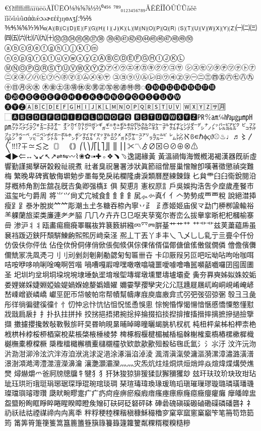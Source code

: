 €ΩﬀﬃﬄāīūēōĀĪŪĒŌ⅛⅜⅝⅞⅓⅔⁰⁴⁵⁶
⁷⁸⁹₀₁₂₃₄₅₆₇₈₉ǍĚẼǏĨǑǓŮŨǎěẽ
ǐĩǒǔůũɑάὰǽɔəɚɛέὲȷŋɵʌʒʃː↉⅖
⅗⅘⅙⅚⅐⅑⅒🄐🄑🄒🄓🄔🄕🄖🄗🄘🄙🄚🄛🄜🄝🄞🄟🄠🄡
🄢🄣🄤🄥🄦🄧🄨🄩㈠㈡㈢㈣㈤㈥㈦㈧㈨㈩㉜㉝㉞㉟㊱㊲㊳
㊴㊵㊶㊷㊸㊹㊺㊻㊼㊽㊾㊿ⓐⓑⓒⓓⓔⓕⓖⓗⓘⓙⓚⓛⓜ
ⓝⓞⓟⓠⓡⓢⓣⓤⓥⓦⓧⓨⓩⒶⒷⒸⒹⒺⒻⒼⒽⒾⒿⓀⓁ
ⓂⓃⓄⓅⓆⓇⓈⓉⓊⓋⓌⓍⓎⓏ㋐㋑㋒㋓㋔㋕㋖㋗㋘㋙㋚
㋛㋜㋝㋞㋟㋠㋡㋢㋣㋤㋥㋦㋧㋨㋩㋪㋫㋬㋭㋮㋯㋰㋱㋲㋳
㋴㋵㋶㋷㋸㋹㋺㋻㋼㋽㋾㊀㊁㊂㊃㊄㊅㊆㊇㊈㊉㊐㊊㊋㊌
㊍㊎㊏㊟㊠㊡㊛㊚㊣㊢㊗㊜㊕㉄◌⓿❿⓫⓬⓭⓮⓯⓰⓱⓲
⓳⓴🅐🅑🅒🅓🅔🅕🅖🅗🅘🅙🅚🅛🅜🅝🅞🅟🅠🅡🅢🅣🅤🅥🅦
🅧🅨🅩🄰🄱🄲🄳🄴🄵🄶🄷🄸🄹🄺🄻🄼🄽🄾🄿🅀🅁🅂🅃🅄🅅
🅆🅇🅈🅉🈂🈷⃞⬚🅰🅱🅲🅳🅴🅵🅶🅷🅸🅹🅺🅻🅼🅽🅾🅿🆀
🆁🆂🆃🆄🆅🆆🆇🆈🆉㏚℀㏂℅㍱㎍㎛㏗㏘㌁㌂㌄㌆㌈㌇㌊
㌉㌋㌌㌎㌏㌐㌑㌒㌓㌗㌙㌚㌛㌜㌝㌟㌠㌡㌤㌥㌨㌩㌭㌮㌯
㌰㌲㌴㌵㌼㌷㌸㌺㌽㍁㌾㌿㍀㍃㍄㍅㍆㍈㍋㍌㍏㍐㍒㍔㍓
㍕㍖ℵϐ∊ℏϕϛϑ⚾♨♩♬〻〳〴〵‼⁉∓≃≲≳〘〙
｟｠⎛⎝⎞⎠⎡⎣⎤⎦⎜⎟⎢⎥⎪✂〽ゟ∅⊠⊖⊘⊕⊗⚠
◀▶⇐↔↘↙↖↗⇌⇋〰⌇❀✿▫▪✚◦❖﹅﹆逸謁緣⿈
黃溫禍悔海慨槪渴褐漢器既祈虛響勤謹揭擊硏穀殺祉視煮
社者臭祝暑署涉狀眞節祖僧層巢憎贈卽嘆著徵懲禎突難梅
繁晚卑碑賓敏侮塀勉步墨每免戾祐欄隆虜淚類曆歷練鍊錄
𠤎貟⻗⺽𦥑𫟘銳閱沿芽槪杮⻆割𦈢舘㐂旣𠮷𩵋卿强𫞎⺩俱
契恵⺼憲权𠩤訁戶吳娛抅浩吿𫝆𫝷歲產䬸巿滋玺𠮟勺爵周
将⺌⺍尙𠀋宂城⻝⻟飠⻞𩙿㞍⺗㣺真⺅亻𠆢㔟𫝑成⻃覀稅
說絕澘揷瘦⻊𧾷𣳾㐧脫炭⺮𥫗彫潮圡𡈽冬糖吞㮈內寧丷⺪
𤴔彥姬姬庙㑨龴勐门𫞉栁諭輸𥙿⺷躶蘭旅鿄类廉連⺹耂𦚰
⺇𠘨𠂊𠦄卉⺋㔾呕夹孶寃尔㟢峦么拔𦦙挛晣𣏌杞槶榆𪧦毌
渗沪⺦丬瓯畵痬癎㾱睪瞩鿆筓𫞽䉤絣繈𠔿⺳𦉪腁䑓艹⺾艹
⺿艹⻀兹荚䔥藴𠂰虽㐮裆䟦迈𨦇𨸗頹騈鯟𫠚𤋮𤋮厉﨑桒𣲾
𠘑丄丅丟丫丯丰乀乁乄⺃乚乿亍亖亹仐仠份仿伋伕你伻佉
佔佺佽佾侗侾俏俽倀倁倐倛倧倮偗偦偪倻傏傖傜僌僦僩僯
儈儋儐儛儞兟冡冼凮凴刁⺉刂刓剉剡剦劓勈勰匊匋匾卌卋
卡卬厫叚另叵吧呍呦呫呴咍咖咡咭咹咿哆响唎唫唵啊啠喈
喎嘈嘎嘏嘷嘿噉噋噏噦噩噯噱噲嚕嚚嚬嚭嚱囉囝囤圊圕圣
圯圳圴坌坰垌垜垸埦埭埵埶埿堉堠堲塼墀墩壎壐壔壚壩夌
夤夯奡奭姊姒姝姣姤娄娌娣婇婕婣婭婾媞媧媬媳嫠嬀嬙嬥
嬭孁孼孾孿宊⺏尣尫尰屣屩屼峋峒峴崤崦嵃嵆嵊嶒嶔嶙嶠
巘巠巸帀帒帔帕帘帮幘幫幬庨庪庾庿廒弇弎弜弝弢弨弶弻
彀⼹彐彘彤徉徜徧徤徯徸⺖忄忉忡忩忭忼怗怚怳恡恿悞悤
悰惋惛惸愒愓愔愜慼憍憟憨懂懟戕戩扃扆⺘扌扑扖拄拼挊
挍挘挹捂捃捥捴捽掄掇掐掞揑揜搉搐搢摔摛摭摻撾撿擥擷
擻攄攖攙敇敧斁斅旂旰旲昬晌晛晜晡晫暤曈曬朅朓朳杈杌
杶杻枰枲柹柗柙柰栬栰栱桛桲桵桺梄梥梲棐棖棨棭棰棱棼
椑椓椵椻楗楣楲楿榀榦榭榷槖槗樁樏樕樨樴樾橅橐橑橖橛
檃檉檑檝檞檟櫜櫧櫬欞欤欵歆歖歠殂殾毡毱氐氳氵⺡⺢汙
汶汻沅沕沜泐泔泖泠泫泬泮洊洎洑洮浗浞浥涂涿淄淊淖淩
渢湑滇滊滎滽漚漪漯漳潚潞潢潽澋澍澒澔澚澧澨澶濚濞瀹
瀼灔灝灞灤⺣灬灾炁炕炷烓烔烘烜焇焠焱煊煒煠煹熒燋燓
燖爀爝爫爸牁牓牕牖牜犍⺨犭犴狇狻猄猅猨猱獃獬獼玃玅
玆玕玞玟玠玦玫玵玷玼珏珙珩珴珽琄琊琚琛琤琨琬琯琰琱
琹瑄瑇瑋瑍瑑瑗瑦瑫瑱璀璅璆璇璐璘璜璠璣璨璫璵璿瓈瓚
瓞畎畹疁疐⽧疒疓疴痤痹瘀瘊瘕瘖瘙瘞瘭瘵癃癋癥癭癯癱
癴皤皥盅盌盬盼眴眶睜睟睠睲睽瞕瞪矦矰矴砆砢砭砮砰砵
硨碞磈磌磎磤磠磡磲磷磻礱⺭礻礽祅祛祜禋禖禘⽱禸离秊
秚稃稉稑稞稭稹穅穌穝穭穸窠窣窳窻窼竆笇笔笧笱筇筎筠
筩筭筲箑箯篗篙簋簏簠簦簱簶籑籙籧籮籰粼粿糈糉糗糙糝
